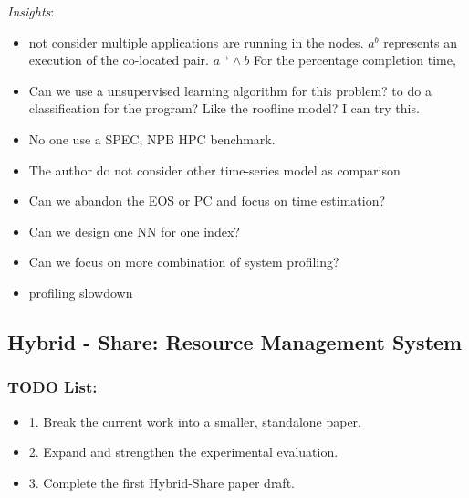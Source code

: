 \documentclass[8pt,UTF8]{article}
\begin{document}
                \emph{Insights}: 
                \begin{itemize}
                    \item not consider multiple applications are running in the nodes. $a^b$ represents an execution of the co-located pair. $a^{\rightarrow} \wedge b$ For the percentage completion time, 
                    \item Can we use a unsupervised learning algorithm for this problem?  to do a classification for the program?  Like the roofline model? I can try this.
                    \item No one use a SPEC, NPB HPC benchmark.
                    \item The author do not consider other time-series model as comparison
                    \item Can we abandon the EOS or PC and focus on time estimation?
                    \item Can we design one NN for one index?
                    \item Can we focus on more combination of system profiling?
                    \item profiling slowdown
                \end{itemize}
    
    \subsection{Hybrid - Share: Resource Management System}
        \subsubsection{TODO List:}
            \begin{itemize}
                \item 1. Break the current work into a smaller, standalone paper.
                \item 2. Expand and strengthen the experimental evaluation.
                \item 3. Complete the first Hybrid-Share paper draft.
            \end{itemize}
\end{document}
